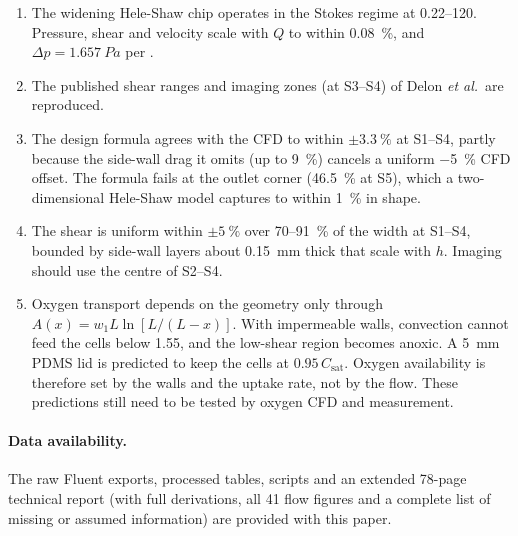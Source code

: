 \documentclass[11pt,a4paper]{article}
\newcommand{\ulmin}{\si{\uLmin}}
\newcommand{\Csat}{C_{\mathrm{sat}}}
\begin{document}
\begin{enumerate}
\item The widening Hele-Shaw chip operates in the Stokes regime at 0.22--\SI{120}{\uLmin}. Pressure, shear and velocity scale with $Q$ to within \SI{0.08}{\percent}, and $\Delta p=\SI{1.657}{Pa}$ per \ulmin.
\item The published shear ranges and imaging zones (at S3--S4) of Delon \emph{et al.}\ are reproduced.
\item The design formula agrees with the CFD to within $\pm\SI{3.3}{\percent}$ at S1--S4, partly because the side-wall drag it omits (up to \SI{+9}{\percent}) cancels a uniform \SI{-5}{\percent} CFD offset. The formula fails at the outlet corner (\SI{+46.5}{\percent} at S5), which a two-dimensional Hele-Shaw model captures to within \SI{1}{\percent} in shape.
\item The shear is uniform within $\pm\SI{5}{\percent}$ over \SI{70}{}--\SI{91}{\percent} of the width at S1--S4, bounded by side-wall layers about \SI{0.15}{mm} thick that scale with $h$. Imaging should use the centre of S2--S4.
\item Oxygen transport depends on the geometry only through $A(x)=w_1L\ln[L/(L-x)]$. With impermeable walls, convection cannot feed the cells below \SI{1.55}{\uLmin}, and the low-shear region becomes anoxic. A \SI{5}{mm} PDMS lid is predicted to keep the cells at $0.95\,\Csat$. Oxygen availability is therefore set by the walls and the uptake rate, not by the flow. These predictions still need to be tested by oxygen CFD and measurement.
\end{enumerate}

\paragraph{Data availability.} The raw Fluent exports, processed tables, scripts and an extended 78-page technical report (with full derivations, all 41 flow figures and a complete list of missing or assumed information) are provided with this paper.



\end{document}
